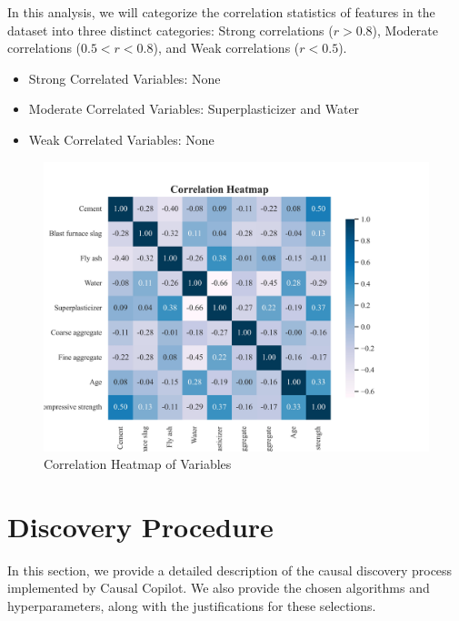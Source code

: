 \documentclass{article}
\begin{document}
\begin{minipage}[t]{0.5\linewidth}
    In this analysis, we will categorize the correlation statistics of features in the dataset into three distinct categories: Strong correlations ($r>0.8$), Moderate correlations ($0.5<r<0.8$), and Weak correlations ($r<0.5$).

\begin{itemize}
\item Strong Correlated Variables: None
\item Moderate Correlated Variables: Superplasticizer and Water
\item Weak Correlated Variables: None
\end{itemize}
\vfill
\end{minipage}
\hfill
\begin{minipage}[t]{0.5\linewidth}
    \begin{figure}[H]
        \centering
        \vspace{-1.5cm}
        \includegraphics[width=\linewidth]{data/dataset/CCS_Data/output_graph/eda_corr.jpg}
        \caption{\label{fig:corr}Correlation Heatmap of Variables}
    \end{figure}
\end{minipage}

\section{Discovery Procedure}

In this section, we provide a detailed description of the causal discovery process implemented by Causal Copilot. 
We also provide the chosen algorithms and hyperparameters, along with the justifications for these selections.
\end{document}
